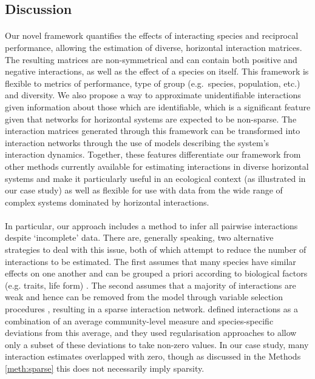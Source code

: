 \documentclass[a4,12pt]{article}
\begin{document}
\begin{refsection}
\section{Discussion}


    \paragraph{} 
    Our novel framework quantifies the effects of interacting species and reciprocal performance, allowing the estimation of diverse, horizontal interaction matrices. The resulting matrices are non-symmetrical and can contain both positive and negative interactions, as well as the effect of a species on itself. This framework is flexible to metrics of performance, type of group (e.g.\ species, population, etc.) and diversity. We also propose a way to approximate unidentifiable interactions given information about those which are identifiable, which is a significant feature given that networks for horizontal systems are expected to be non-sparse. The interaction matrices generated through this framework can be transformed into interaction networks through the use of models describing the system's interaction dynamics. Together, these features differentiate our framework from other methods currently available for estimating interactions in diverse horizontal systems and make it particularly useful in an ecological context (as illustrated in our case study) as well as flexible for use with data from the wide range of complex systems dominated by horizontal interactions.

    \paragraph{}
    In particular, our approach includes a method to infer all pairwise interactions despite `incomplete' data. There are, generally speaking, two alternative strategies to deal with this issue, both of which attempt to reduce the number of interactions to be estimated. The first assumes that many species have similar effects on one another and can be grouped a priori according to biological factors (e.g. traits, life form) \parencite{Uriarte2004, Martyn2020}. The second assumes that a majority of interactions are weak and hence can be removed from the model through variable selection procedures \parencite{Mutshinda2009, Weiss-Lehman2022}, resulting in a sparse interaction network. \textcite{Weiss-Lehman2022} defined interactions as a combination of an average community-level measure and species-specific deviations from this average, and they used regularisation approaches to allow only a subset of these deviations to take non-zero values. In our case study, many interaction estimates overlapped with zero, though as discussed in the Methods \ref{meth:sparse} this does not necessarily imply sparsity.


\end{refsection}
\end{document}
